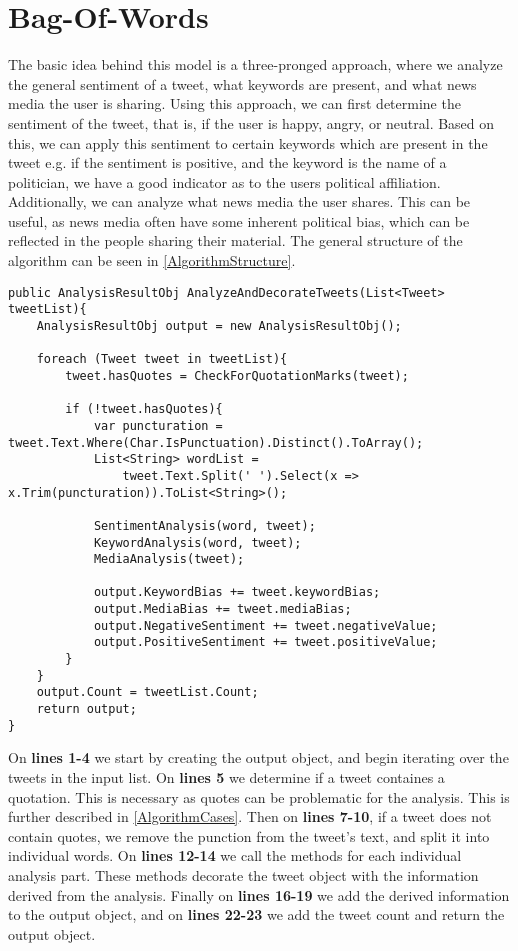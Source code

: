 \section{Bag-Of-Words}\label{sec:BoW}
The basic idea behind this model is a three-pronged approach, where we
analyze the general sentiment of a tweet, what keywords are present, and what
news media the user is sharing. Using this approach, we can first determine the
sentiment of the tweet, that is, if the user is happy, angry, or neutral. Based
on this, we can apply this sentiment to certain keywords which are present in
the tweet e.g. if the sentiment is positive, and the keyword is the name of a
politician, we have a good indicator as to the users political affiliation.
Additionally, we can analyze what news media the user shares. This can be
useful, as news media often have some inherent political bias, which can be
reflected in the people sharing their material. The general structure of the
algorithm can be seen in \autoref{AlgorithmStructure}.\\

\begin{minipage}[H]{\linewidth}
\begin{lstlisting}[caption = Main method for handling the algorithm, label = AlgorithmStructure]
public AnalysisResultObj AnalyzeAndDecorateTweets(List<Tweet> tweetList){
	AnalysisResultObj output = new AnalysisResultObj();
   	
   	foreach (Tweet tweet in tweetList){
       	tweet.hasQuotes = CheckForQuotationMarks(tweet);
        
        if (!tweet.hasQuotes){
           	var puncturation = tweet.Text.Where(Char.IsPunctuation).Distinct().ToArray(); 
           	List<String> wordList = 
           		tweet.Text.Split(' ').Select(x => x.Trim(puncturation)).ToList<String>();
                       
            SentimentAnalysis(word, tweet);
            KeywordAnalysis(word, tweet);
            MediaAnalysis(tweet);

            output.KeywordBias += tweet.keywordBias;
            output.MediaBias += tweet.mediaBias;
            output.NegativeSentiment += tweet.negativeValue;
            output.PositiveSentiment += tweet.positiveValue;
        }
    }
    output.Count = tweetList.Count;
    return output;
}
\end{lstlisting}
\end{minipage}

On \textbf{lines 1-4} we start by creating the output object, and begin
iterating over the tweets in the input list. On \textbf{lines 5} we
determine if a tweet containes a quotation. This is necessary as quotes can be
problematic for the analysis. This is further described in
\autoref{AlgorithmCases}. Then on \textbf{lines 7-10}, if a tweet does not
contain quotes, we remove the punction from the tweet's text, and split it into
individual words. On \textbf{lines 12-14} we call the methods for each
individual analysis part. These methods decorate the tweet object with the
information derived from the analysis. Finally on \textbf{lines 16-19} we add
the derived information to the output object, and on \textbf{lines 22-23} we add
the tweet count and return the output object.

